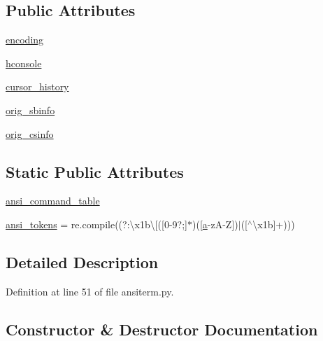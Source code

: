 \subsection*{Public Attributes}
\begin{DoxyCompactItemize}
\item 
\hyperlink{classwaflib_1_1ansiterm_1_1_ansi_term_a0fb424a10f22b89aba6cbbebf65589ac}{encoding}
\item 
\hyperlink{classwaflib_1_1ansiterm_1_1_ansi_term_aa5e4b02b28ffb23ef4cddb01b866537c}{hconsole}
\item 
\hyperlink{classwaflib_1_1ansiterm_1_1_ansi_term_aca319458521a5e2101565c007b9371cf}{cursor\+\_\+history}
\item 
\hyperlink{classwaflib_1_1ansiterm_1_1_ansi_term_a046a1bf40ae2d55263bf7c692612e64d}{orig\+\_\+sbinfo}
\item 
\hyperlink{classwaflib_1_1ansiterm_1_1_ansi_term_a4f26502bfb0fcfac2e99a5091bc1d272}{orig\+\_\+csinfo}
\end{DoxyCompactItemize}
\subsection*{Static Public Attributes}
\begin{DoxyCompactItemize}
\item 
\hyperlink{classwaflib_1_1ansiterm_1_1_ansi_term_a0f8959dd1b222de63fe0cc0e4c88b416}{ansi\+\_\+command\+\_\+table}
\item 
\hyperlink{classwaflib_1_1ansiterm_1_1_ansi_term_a5b92994d43913428d28eab18a6daa79b}{ansi\+\_\+tokens} = re.\+compile(\textquotesingle{}(?\+:\textbackslash{}x1b\textbackslash{}\mbox{[}(\mbox{[}0-\/9?;\mbox{]}$\ast$)(\mbox{[}\hyperlink{rfft2d_test_m_l_8m_a4124bc0a9335c27f086f24ba207a4912}{a}-\/zA-\/Z\mbox{]})$\vert$(\mbox{[}$^\wedge$\textbackslash{}x1b\mbox{]}+))\textquotesingle{})
\end{DoxyCompactItemize}


\subsection{Detailed Description}


Definition at line 51 of file ansiterm.\+py.



\subsection{Constructor \& Destructor Documentation}

